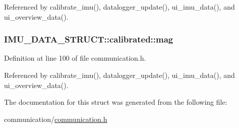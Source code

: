 Referenced by calibrate\-\_\-imu(), datalogger\-\_\-update(), ui\-\_\-imu\-\_\-data(), and ui\-\_\-overview\-\_\-data().

\hypertarget{structIMU__DATA__STRUCT_1_1calibrated_a2fde6c6759e0fda17e272c32096cb9ec}{
\subsubsection[{mag}]{ I\-M\-U\-\_\-\-D\-A\-T\-A\-\_\-\-S\-T\-R\-U\-C\-T\-::calibrated\-::mag}}\label{structIMU__DATA__STRUCT_1_1calibrated_a2fde6c6759e0fda17e272c32096cb9ec}


Definition at line 100 of file communication.\-h.



Referenced by calibrate\-\_\-imu(), datalogger\-\_\-update(), ui\-\_\-imu\-\_\-data(), and ui\-\_\-overview\-\_\-data().



The documentation for this struct was generated from the following file\-:\begin{DoxyCompactItemize}
\item 
communication/\hyperlink{communication_2communication_8h}{communication.\-h}\end{DoxyCompactItemize}
